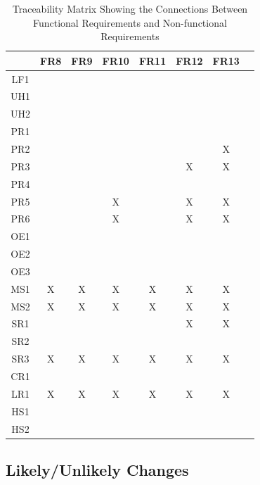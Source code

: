 \documentclass[12pt]{article}
\begin{document}
\begin{table}[h!]
    \centering
    \begin{tabular}{|c|c|c|c|c|c|c|c|}
    \hline
        & FR8 & FR9 & FR10 & FR11 & FR12 & FR13 \\
    \hline
    LF1 & & & & & &    \\ \hline
    UH1 & & & & & &    \\ \hline
    UH2 & & & & & &    \\ \hline
    PR1 & & & & & &    \\ \hline
    PR2 & & & & & & X   \\ \hline
    PR3 & & & & & X & X    \\ \hline
    PR4 & & & & & &    \\ \hline
    PR5 & & & X & & X & X    \\ \hline
    PR6 & & & X & & X & X    \\ \hline
    OE1 & & & & & &    \\ \hline
    OE2 & & & & & &    \\ \hline
    OE3 & & & & & &    \\ \hline
    MS1 & X & X & X & X & X & X  \\ \hline
    MS2 & X & X & X & X & X & X  \\ \hline
    SR1 & & & & & X & X   \\ \hline
    SR2 & & & & & &    \\ \hline
    SR3 & X & X & X & X & X & X  \\ \hline
    CR1 & & & & & &    \\ \hline
    LR1 & X & X & X & X & X & X  \\ \hline
    HS1 & & & & & &    \\ \hline
    HS2 & & & & & &    \\ \hline
    \end{tabular}
    \caption{Traceability Matrix Showing the Connections Between Functional Requirements and Non-functional Requirements} \label{TblTrace_2}
\end{table}

\newpage
\subsection{Likely/Unlikely Changes}
\end{document}
